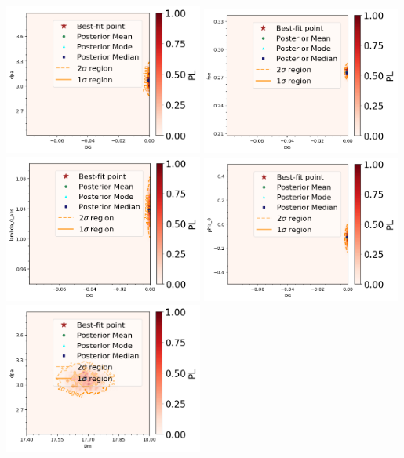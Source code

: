 \begin{center}
\includegraphics[width=0.49\textwidth]{figs/DG_vs_dpa.png}
\includegraphics[width=0.49\textwidth]{figs/DG_vs_fpe.png}\\
\includegraphics[width=0.49\textwidth]{figs/DG_vs_lambda_0_abs.png}
\includegraphics[width=0.49\textwidth]{figs/DG_vs_phis_0.png}\\
\includegraphics[width=0.49\textwidth]{figs/Dm_vs_dpa.png}

\end{center}
